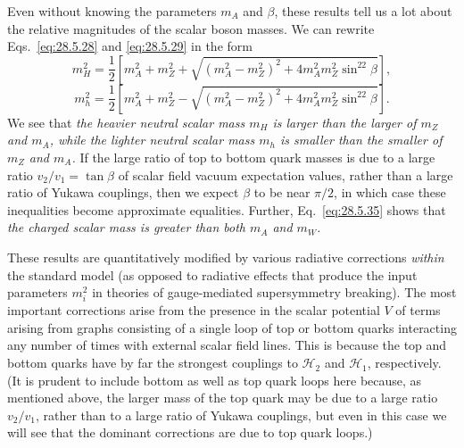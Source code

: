 Even without knowing the parameters \(m_A\) and \(\beta\), these results
tell us a lot about the relative magnitudes of the scalar boson masses. We
can rewrite Eqs.~\eqref{eq:28.5.28} and \eqref{eq:28.5.29} in the form
\begin{equation}
  m_H^2
  =\frac12\left[
    m_A^2+m_Z^2
    +\sqrt{(m_A^2-m_Z^2)^2+4m_A^2m_Z^2\sin^22\beta}
  \right],
  \tag{28.5.36}\label{eq:28.5.36}
\end{equation}
\begin{equation}
  m_h^2
  =\frac12\left[
    m_A^2+m_Z^2
    -\sqrt{(m_A^2-m_Z^2)^2+4m_A^2m_Z^2\sin^22\beta}
  \right].
  \tag{28.5.37}\label{eq:28.5.37}
\end{equation}
We see that \textit{the heavier neutral scalar mass \(m_H\) is larger than
the larger of \(m_Z\) and \(m_A\), while the lighter neutral scalar mass
\(m_h\) is smaller than the smaller of \(m_Z\) and \(m_A\).} If the large
ratio of top to bottom quark masses is due to a large ratio
\(v_2/v_1=\tan\beta\) of scalar field vacuum expectation values, rather
than a large ratio of Yukawa couplings, then we expect \(\beta\) to be near
\(\pi/2\), in which case these inequalities become approximate equalities.
Further, Eq.~\eqref{eq:28.5.35} shows that \textit{the charged scalar mass
is greater than both \(m_A\) and \(m_W\).}

These results are quantitatively modified by various radiative corrections
\textit{within} the standard model (as opposed to radiative effects that
produce the input parameters \(m_i^2\) in theories of gauge-mediated
supersymmetry breaking). The most important corrections arise from the
presence in the scalar potential \(V\) of terms arising from graphs
consisting of a single loop of top or bottom quarks interacting any number
of times with external scalar field lines. This is because the top and
bottom quarks have by far the strongest couplings to \(\mathcal{H}_2\) and
\(\mathcal{H}_1\), respectively. (It is prudent to include bottom as well as
top quark loops here because, as mentioned above, the larger mass of the top
quark may be due to a large ratio \(v_2/v_1\), rather than to a large ratio
of Yukawa couplings, but even in this case we will see that the dominant
corrections are due to top quark loops.)

